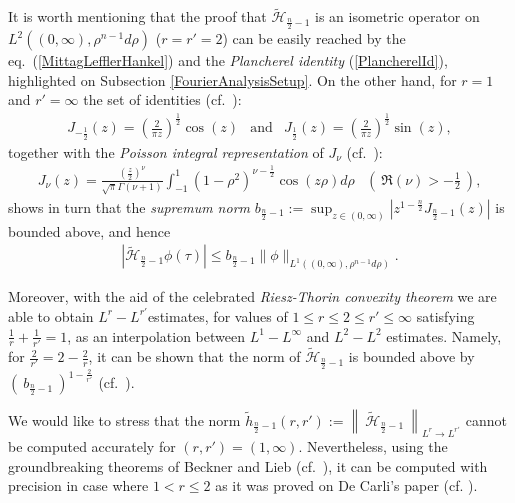 \documentclass{amsart}
\theoremstyle{definition}
\theoremstyle{remark}
\numberwithin{equation}{section}
\begin{document}
It is worth mentioning that the proof that $\widetilde{\mathcal{H}}_{\frac{n}{2}-1}$ is an isometric operator on $L^{2}((0,\infty),\rho^{n-1}d\rho)$ ($r=r'=2$) can be easily reached by the eq.~(\ref{MittagLefflerHankel}) and the {\it Plancherel identity} (\ref{PlancherelId}), highlighted on Subsection \ref{FourierAnalysisSetup}.
On the other hand, for $r=1$ and $r'=\infty$ the set of identities (cf.~\cite[eq.~(1.7.4)]{KST06}):
\begin{eqnarray*}
	J_{-\frac{1}{2}}(z)=\left(\frac{2}{\pi z}\right)^{\frac{1}{2}}\cos(z) &\mbox{and} & J_{\frac{1}{2}}(z)=\left(\frac{2}{\pi z}\right)^{\frac{1}{2}}\sin(z),
\end{eqnarray*}
together with the {\it Poisson integral representation} of $J_\nu$ (cf.~\cite[eq.~(1.7.5)]{KST06}):
\begin{eqnarray*}
	J_\nu(z)=\frac{\left(\frac{z}{2}\right)^\nu}{\sqrt{\pi}\Gamma(\nu+1)}\int_{-1}^1 (1-\rho^2)^{\nu-\frac{1}{2}}\cos(z\rho) d\rho& \left(~\Re(\nu)>-\frac{1}{2}~\right),
\end{eqnarray*}
shows in turn that the {\it supremum norm} $\displaystyle b_{\frac{n}{2}-1}:=\sup_{z\in (0,\infty)}\left|z^{1-\frac{n}{2}}J_{\frac{n}{2}-1}(z)\right|$ is bounded above, and hence
\begin{eqnarray*}
	\left|\widetilde{\mathcal{H}}_{\frac{n}{2}-1}\phi(\tau)\right|\leq b_{\frac{n}{2}-1} \|\phi\|_{L^1((0,\infty),\rho^{n-1}d\rho)}.
\end{eqnarray*}

Moreover, with the aid of the celebrated {\it Riesz-Thorin convexity theorem} we are able to obtain $L^r-L^{r'}$estimates, for values of $1\leq r\leq 2\leq r'\leq \infty$ satisfying $\displaystyle \frac{1}{r}+\frac{1}{r'}=1$, as an interpolation between $L^1-L^\infty$ and $L^2-L^2$ estimates. Namely, for $\displaystyle \frac{2}{r'}=2-\frac{2}{r}$, it can be shown that the norm of $\widetilde{\mathcal{H}}_{\frac{n}{2}-1}$ is bounded above by $\displaystyle \left(~b_{\frac{n}{2}-1}~\right)^{1-\frac{2}{r'}}$ (cf.~\cite[eq.~(2.5)]{DeCarli08}).

We would like to stress that the norm $\displaystyle \widetilde{h}_{\frac{n}{2}-1}(r,r'):=\left\|~\widetilde{\mathcal{H}}_{\frac{n}{2}-1}~\right\|_{L^r\rightarrow L^{r'}}$ cannot be computed accurately for $(r,r')=(1,\infty)$. Nevertheless, using the groundbreaking theorems of Beckner and Lieb (cf.~\cite{beckner1975inequalities,lieb1990gaussian}), it can be computed with precision in case where $1<r\leq 2$ as it was proved on De Carli's paper \cite{DeCarli08} (cf. \cite[Proposition 2.1.]{DeCarli08}).
\end{document}
